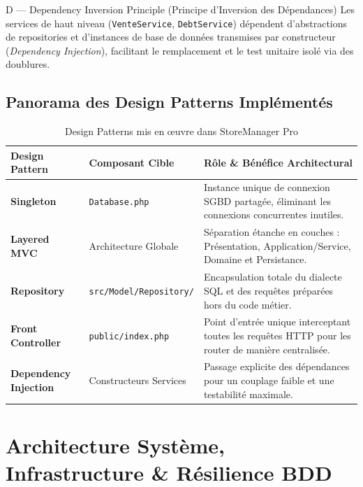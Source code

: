 \documentclass[11pt,a4paper,titlepage,twoside,openright]{report}
\begin{document}
\begin{solidbox}{D — Dependency Inversion Principle (Principe d'Inversion des Dépendances)}
Les services de haut niveau (\texttt{VenteService}, \texttt{DebtService}) dépendent d'abstractions de repositories et d'instances de base de données transmises par constructeur (\emph{Dependency Injection}), facilitant le remplacement et le test unitaire isolé via des doublures.
\end{solidbox}

\section{Panorama des Design Patterns Implémentés}

\begin{table}[htbp]
\centering
\small
\begin{tabularx}{\textwidth}{llX}
\toprule
\textbf{Design Pattern} & \textbf{Composant Cible} & \textbf{Rôle \& Bénéfice Architectural} \\
\midrule
\textbf{Singleton} & \texttt{Database.php} & Instance unique de connexion SGBD partagée, éliminant les connexions concurrentes inutiles. \\
\textbf{Layered MVC} & Architecture Globale & Séparation étanche en couches : Présentation, Application/Service, Domaine et Persistance. \\
\textbf{Repository} & \texttt{src/Model/Repository/} & Encapsulation totale du dialecte SQL et des requêtes préparées hors du code métier. \\
\textbf{Front Controller} & \texttt{public/index.php} & Point d'entrée unique interceptant toutes les requêtes HTTP pour les router de manière centralisée. \\
\textbf{Dependency Injection} & Constructeurs Services & Passage explicite des dépendances pour un couplage faible et une testabilité maximale. \\
\bottomrule
\end{tabularx}
\caption{Design Patterns mis en œuvre dans StoreManager Pro}
\label{tab:design_patterns}
\end{table}

\chapter{Architecture Système, Infrastructure \& Résilience BDD}
\end{document}
